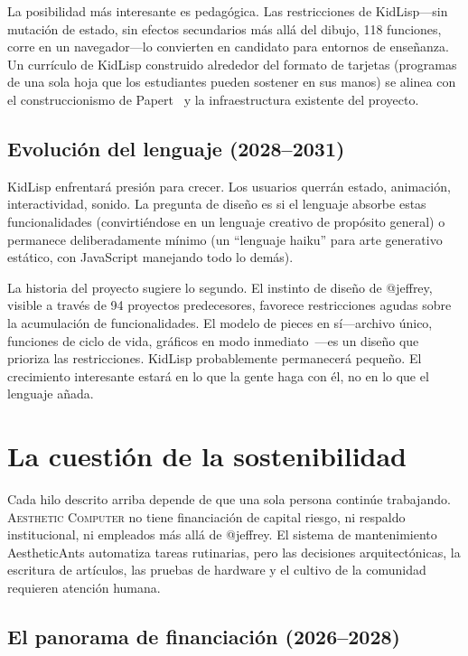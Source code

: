 \documentclass[10pt,letterpaper,twocolumn]{article}
\newcommand{\ac}{\textsc{Aesthetic Computer}}
\begin{document}
La posibilidad más interesante es pedagógica. Las restricciones de KidLisp---sin mutación de estado, sin efectos secundarios más allá del dibujo, 118 funciones, corre en un navegador---lo convierten en candidato para entornos de enseñanza. Un currículo de KidLisp construido alrededor del formato de tarjetas (programas de una sola hoja que los estudiantes pueden sostener en sus manos) se alinea con el construccionismo de Papert~\citep{papert1980mindstorms} y la infraestructura existente del proyecto.

\subsection{Evolución del lenguaje (2028--2031)}

KidLisp enfrentará presión para crecer. Los usuarios querrán estado, animación, interactividad, sonido. La pregunta de diseño es si el lenguaje absorbe estas funcionalidades (convirtiéndose en un lenguaje creativo de propósito general) o permanece deliberadamente mínimo (un ``lenguaje haiku'' para arte generativo estático, con JavaScript manejando todo lo demás).

La historia del proyecto sugiere lo segundo. El instinto de diseño de @jeffrey, visible a través de 94 proyectos predecesores, favorece restricciones agudas sobre la acumulación de funcionalidades. El modelo de pieces en sí---archivo único, funciones de ciclo de vida, gráficos en modo inmediato~\citep{scudder2026pieces}---es un diseño que prioriza las restricciones. KidLisp probablemente permanecerá pequeño. El crecimiento interesante estará en lo que la gente haga con él, no en lo que el lenguaje añada.


\section{La cuestión de la sostenibilidad}
\label{sec:sustainability}

Cada hilo descrito arriba depende de que una sola persona continúe trabajando. \ac{} no tiene financiación de capital riesgo, ni respaldo institucional, ni empleados más allá de @jeffrey. El sistema de mantenimiento AestheticAnts automatiza tareas rutinarias, pero las decisiones arquitectónicas, la escritura de artículos, las pruebas de hardware y el cultivo de la comunidad requieren atención humana.

\subsection{El panorama de financiación (2026--2028)}
\end{document}
